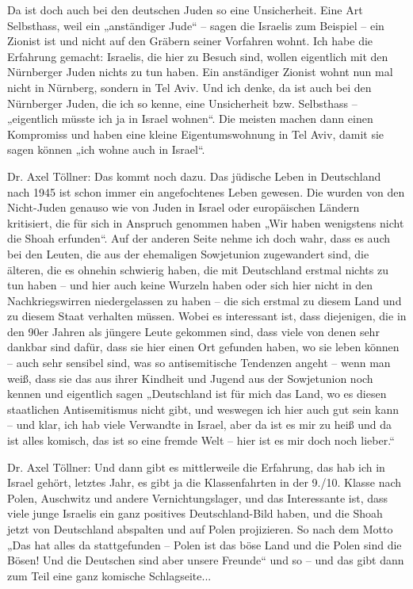  
Da ist doch auch bei den deutschen Juden so eine Unsicherheit. Eine Art Selbsthass, weil ein „anständiger Jude“ – sagen die Israelis zum Beispiel – ein Zionist ist und nicht auf den Gräbern seiner Vorfahren wohnt. Ich habe die Erfahrung gemacht: Israelis, die hier zu Besuch sind, wollen eigentlich mit den Nürnberger Juden nichts zu tun haben. Ein anständiger Zionist wohnt nun mal nicht in Nürnberg, sondern in Tel Aviv. Und ich denke, da ist auch bei den Nürnberger Juden, die ich so kenne, eine Unsicherheit bzw. Selbsthass – „eigentlich müsste ich ja in Israel wohnen“. Die meisten machen dann einen Kompromiss und haben eine kleine Eigentumswohnung in Tel Aviv, damit sie sagen können „ich wohne auch in Israel“.  

 
Dr. Axel Töllner: Das kommt noch dazu. Das jüdische Leben in Deutschland nach 1945 ist schon immer ein angefochtenes Leben gewesen. Die wurden von den Nicht-Juden genauso wie von Juden in Israel oder europäischen Ländern kritisiert, die für sich in Anspruch genommen haben „Wir haben wenigstens nicht die Shoah erfunden“. Auf der anderen Seite nehme ich doch wahr, dass es auch bei den Leuten, die aus der ehemaligen Sowjetunion zugewandert sind, die älteren, die es ohnehin schwierig haben, die mit Deutschland erstmal nichts zu tun haben – und hier auch keine Wurzeln haben oder sich hier nicht in den Nachkriegswirren niedergelassen zu haben – die sich erstmal zu diesem Land und zu diesem Staat verhalten müssen. Wobei es interessant ist, dass diejenigen, die in den 90er Jahren als jüngere Leute gekommen sind, dass viele von denen sehr dankbar sind dafür, dass sie hier einen Ort gefunden haben, wo sie leben können – auch sehr sensibel sind, was so antisemitische Tendenzen angeht – wenn man weiß, dass sie das aus ihrer Kindheit und Jugend aus der Sowjetunion noch kennen und eigentlich sagen „Deutschland ist für mich das Land, wo es diesen staatlichen Antisemitismus nicht gibt, und weswegen ich hier auch gut sein kann – und klar, ich hab viele Verwandte in Israel, aber da ist es mir zu heiß und da ist alles komisch, das ist so eine fremde Welt – hier ist es mir doch noch lieber.“ 

 
Dr. Axel Töllner: Und dann gibt es mittlerweile die Erfahrung, das hab ich in Israel gehört, letztes Jahr, es gibt ja die Klassenfahrten in der 9./10. Klasse nach Polen, Auschwitz und andere Vernichtungslager, und das Interessante ist, dass viele junge Israelis ein ganz positives Deutschland-Bild haben, und die Shoah jetzt von Deutschland abspalten und auf Polen projizieren. So nach dem Motto „Das hat alles da stattgefunden – Polen ist das böse Land und die Polen sind die Bösen! Und die Deutschen sind aber unsere Freunde“ und so – und das gibt dann zum Teil eine ganz komische Schlagseite... 


